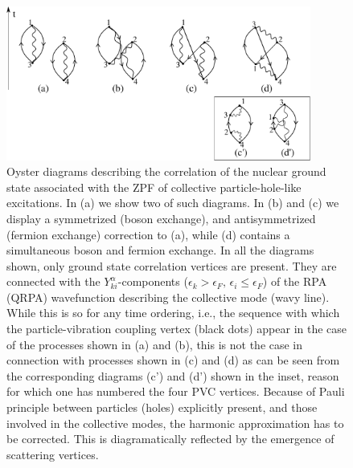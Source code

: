\begin{figure}
\centerline {
\includegraphics*[width=10cm]{introduccion/figs/figintroA1}
}
\caption[Oyster diagrams and zero-point fluctuations.]{ Oyster diagrams describing the correlation of the nuclear ground state associated with the ZPF of  collective particle-hole-like excitations. In (a) we show two of such diagrams. In (b) and (c) we display a symmetrized (boson exchange), and antisymmetrized  (fermion exchange) correction to (a), while  (d) contains a simultaneous boson and fermion exchange. In all the diagrams shown, only ground state correlation vertices are present. They are connected with the $Y^\alpha_{ki}$-components ($\epsilon_k>\epsilon_F, \,\epsilon_i\le\epsilon_F$) of the RPA (QRPA) wavefunction describing the collective mode (wavy line). While this is so for any time ordering, i.e., the sequence with which the particle-vibration coupling vertex (black dots) appear in the case of the processes shown in (a) and (b), this is not the case in connection with processes shown in (c) and (d) as can be seen from the corresponding diagrams (c') and (d') shown in the inset, reason for which one has numbered the four PVC vertices. Because of Pauli principle between particles (holes) explicitly present, and those involved in the collective modes, the harmonic approximation has to be corrected. This is diagramatically reflected by the emergence  of scattering vertices.}
\label{figintroA1}
\end{figure}
